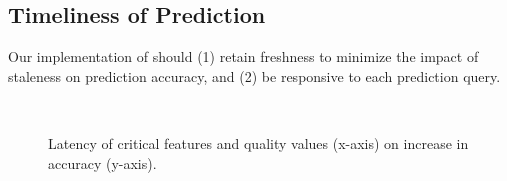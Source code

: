\subsection{Timeliness of Prediction}
\label{subsec:eval-scalability}

Our implementation of \dda should
(1) retain freshness to minimize the impact of staleness on prediction accuracy, and 
(2) be responsive to each prediction query. 




\begin{figure}[t!]
\centering
\\
\caption{Latency of critical features and quality values 
(x-axis) on increase in accuracy (y-axis).}
\label{fig:insight-staleness}
\end{figure}



